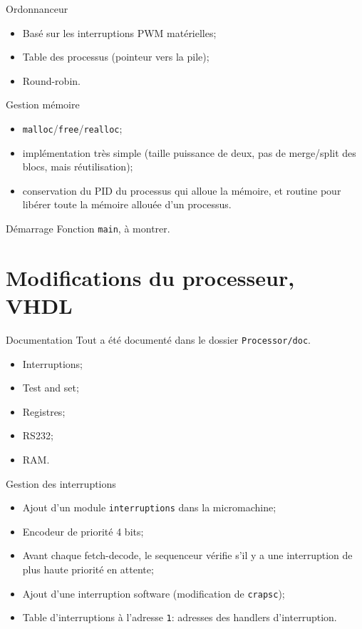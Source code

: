 \documentclass{beamer}
\begin{document}
    \begin{frame}[fragile]{Ordonnanceur}
      \begin{itemize}
        \item Basé sur les interruptions PWM matérielles;
        \item Table des processus (pointeur vers la pile);
        \item Round-robin.
      \end{itemize}
\end{frame}

    \begin{frame}[fragile]{Gestion mémoire}
      \begin{itemize}
        \item \verb+malloc+/\verb+free+/\verb+realloc+;
        \item implémentation très simple (taille puissance de deux, pas de
          merge/split des blocs, mais réutilisation);
        \item conservation du PID du processus qui alloue la mémoire, et routine
          pour libérer toute la mémoire allouée d'un processus.
      \end{itemize}
\end{frame}

    \begin{frame}[fragile]{Démarrage}
      Fonction \verb+main+, à montrer.
\end{frame}

  \section{Modifications du processeur, VHDL}
    \begin{frame}[fragile]{Documentation}
      Tout a été documenté dans le dossier \verb+Processor/doc+.
      \begin{itemize}
        \item Interruptions;
        \item Test and set;
        \item Registres;
        \item RS232;
        \item RAM.
      \end{itemize}
\end{frame}

    \begin{frame}[fragile]{Gestion des interruptions}
      \begin{itemize}
        \item Ajout d'un module \verb+interruptions+ dans la micromachine;
        \item Encodeur de priorité 4 bits;
        \item Avant chaque fetch-decode, le sequenceur vérifie s'il y a une
          interruption de plus haute priorité en attente;
        \item Ajout d'une interruption software (modification de \verb+crapsc+);
        \item Table d'interruptions à l'adresse \verb+1+: adresses des handlers
          d'interruption.
      \end{itemize}
\end{frame}
\end{document}
